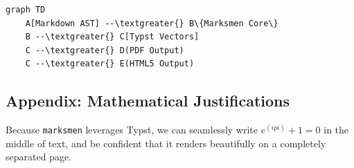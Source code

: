 \documentclass{article}
\begin{document}
\begin{lstlisting}[language=mermaid]
graph TD
    A[Markdown AST] --\textgreater{} B\{Marksmen Core\}
    B --\textgreater{} C[Typst Vectors]
    C --\textgreater{} D(PDF Output)
    C --\textgreater{} E(HTML5 Output)
\end{lstlisting}

\subsection{Appendix: Mathematical Justifications}


Because \texttt{marksmen} leverages Typst, we can seamlessly write $e^(i pi) + 1 = 0$ in the middle of text, and be confident that it renders beautifully on a completely separated page.
\end{document}
